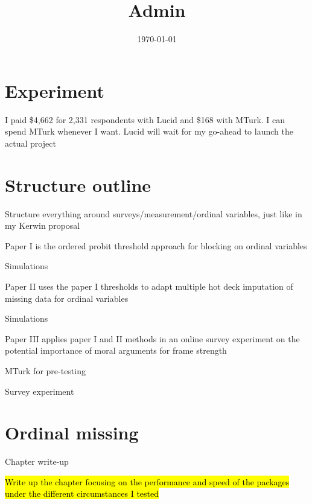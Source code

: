 

\title{Admin}

\date{\today}



\maketitle


\section*{Experiment}
	\begin{coi}
		\item I paid \$4,662 for 2,331 respondents with Lucid and \$168 with MTurk. I can spend MTurk whenever I want. Lucid will wait for my go-ahead to launch the actual project
	\end{coi}	
	
\section*{Structure outline}
	\begin{coi}
		\item Structure everything around surveys/measurement/ordinal variables, just like in my Kerwin proposal
		\item Paper I is the ordered probit threshold approach for blocking on ordinal variables
			\begin{coi}
				\item Simulations
			\end{coi}
		\item Paper II uses the paper I thresholds to adapt multiple hot deck imputation of missing data for ordinal variables
			\begin{coi}
				\item Simulations
			\end{coi}
		\item Paper III applies paper I and II methods in an online survey experiment on the potential importance of moral arguments for frame strength
			\begin{coi}
				\item MTurk for pre-testing
				\item Survey experiment
			\end{coi}
	\end{coi}


\section*{Ordinal missing}
	\begin{coi}
		\item Chapter write-up
			\begin{coi}
				\item \hl{Write up the chapter focusing on the performance and speed of the packages under the different circumstances I tested}
			\end{coi}
	\end{coi}
	
